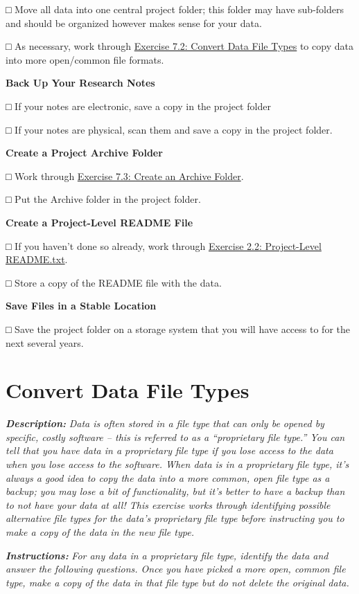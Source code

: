 \documentclass[
]{book}
\begin{document}
□ Move all data into one central project folder; this folder may have sub-folders and should be organized however makes sense for your data.

□ As necessary, work through \protect\hyperlink{file-type}{Exercise 7.2: Convert Data File Types} to copy data into more open/common file formats.

\textbf{Back Up Your Research Notes}

□ If your notes are electronic, save a copy in the project folder

□ If your notes are physical, scan them and save a copy in the project folder.

\textbf{Create a Project Archive Folder}

□ Work through \protect\hyperlink{archive-folder}{Exercise 7.3: Create an Archive Folder}.

□ Put the Archive folder in the project folder.

\textbf{Create a Project-Level README File}

□ If you haven't done so already, work through \protect\hyperlink{readme-txt}{Exercise 2.2: Project-Level README.txt}.

□ Store a copy of the README file with the data.

\textbf{Save Files in a Stable Location}

□ Save the project folder on a storage system that you will have access to for the next several years.

\hypertarget{file-type}{%
\section{Convert Data File Types}\label{file-type}}

\textbf{\emph{Description:}} \emph{Data is often stored in a file type that can only be opened by specific, costly software -- this is referred to as a ``proprietary file type.'' You can tell that you have data in a proprietary file type if you lose access to the data when you lose access to the software. When data is in a proprietary file type, it's always a good idea to copy the data into a more common, open file type as a backup; you may lose a bit of functionality, but it's better to have a backup than to not have your data at all! This exercise works through identifying possible alternative file types for the data's proprietary file type before instructing you to make a copy of the data in the new file type.}

\textbf{\emph{Instructions:}} \emph{For any data in a proprietary file type, identify the data and answer the following questions. Once you have picked a more open, common file type, make a copy of the data in that file type but do not delete the original data.}
\end{document}
